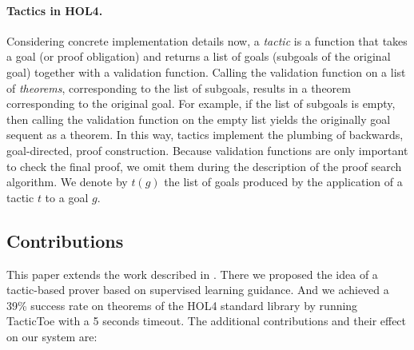 \documentclass[runningheads,a4paper,draft]{svjour3}
\def\holfour{\textsf{HOL4}\xspace}
\def\tactictoe{\textsf{TacticToe}\xspace}
\begin{document}
\paragraph{Tactics in \holfour.}
Considering concrete implementation details now, a \emph{tactic} is a function
that takes a goal (or proof obligation) and returns a list of goals (subgoals
of the original goal) together
with a validation function.
Calling the validation function on a list of \emph{theorems}, corresponding to
the list of subgoals, results in a theorem corresponding to the original goal.
For example, if the list of subgoals is empty, then calling the validation
function on the empty list yields the originally goal sequent as a theorem.
In this way, tactics implement the plumbing of backwards, goal-directed, proof
construction.
Because validation functions are only important to check the final proof, we
omit them during the description of the proof search algorithm. We denote by
$t(g)$ the list of goals produced by the application of a tactic $t$ to a goal
$g$.

\subsection{Contributions}
This paper extends the work described in \cite{tgckju-lpar17}.
There we proposed the idea of a tactic-based prover based on supervised
learning guidance. And we achieved a 39\% success rate on theorems of the
\holfour standard library by running \tactictoe with a 5 seconds timeout.
The additional contributions and their effect on our system are:
\end{document}
